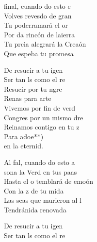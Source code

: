 \begin{cancion}%
	 final, cuando do esto e \\
	Volves revesdo de gran  \\
	Tu poderramará el or\\
	Por da rincón de laierra\\
	Tu prcia alegrará la Creaón\\
	Que espeba tu promesa\jump\\
	\begin{chorus}%
		De resucir a tu igen\\
		Ser tan ls como el re\\
		Resucir por tu ngre\\
		Renas para arte\\
		Vivemos por fin de verd\\
		Congres por un mismo dre\\
		Reinamos contigo en tu z\\
		Para adoe**)\\
		en la eternid.\jump\\
	\end{chorus}%
	Al fal, cuando do esto a  \\
	sona la Verd en tus paas \\
	Hasta el o temblará de emoón\\
	Con la z de tu mida\\
	Las seas que murieron al l\\
	Tendránida renovada\jump\\
	\begin{chorus}%
		De resucir a tu igen\\
		Ser tan ls como el \chord{Re}{}{ai}re\\

\end{chorus}
\end{cancion}
